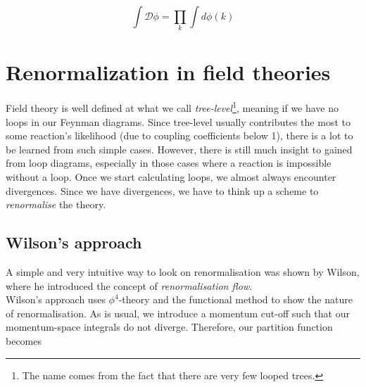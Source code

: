 \documentclass[10pt,twoside]{report}
\begin{document}
	\begin{equation}
		\int\mathcal{D}\phi =  \prod_k\int d\phi(k)
	\end{equation}
	
	
	

	
	\section{Renormalization in field theories}
	Field theory is well defined at what we call \emph{tree-level}\footnote{The name comes from the fact that there are very few looped trees.}, meaning if we have no loops in our Feynman diagrams. Since tree-level usually contributes the most to some reaction's likelihood (due to coupling coefficients below 1), there is a lot to be learned from such simple cases. However, there is still much insight to gained from loop diagrams, especially in those cases where a reaction is impossible without a loop. Once we start calculating loops, we almost always encounter divergences. Since we have divergences, we have to think up a scheme to \emph{renormalise} the theory.
	
	\subsection{Wilson's approach}
	A simple and very intuitive way to look on renormalisation was shown by Wilson, where he introduced the concept of \emph{renormalisation flow}.\\
	
	Wilson's approach uses $\phi^4$-theory \cite{PeskinSchroeder} and the functional method to show the nature of renormalisation. As is usual, we introduce a momentum cut-off such that our momentum-space integrals do not diverge. Therefore, our partition function becomes
	
\end{document}
